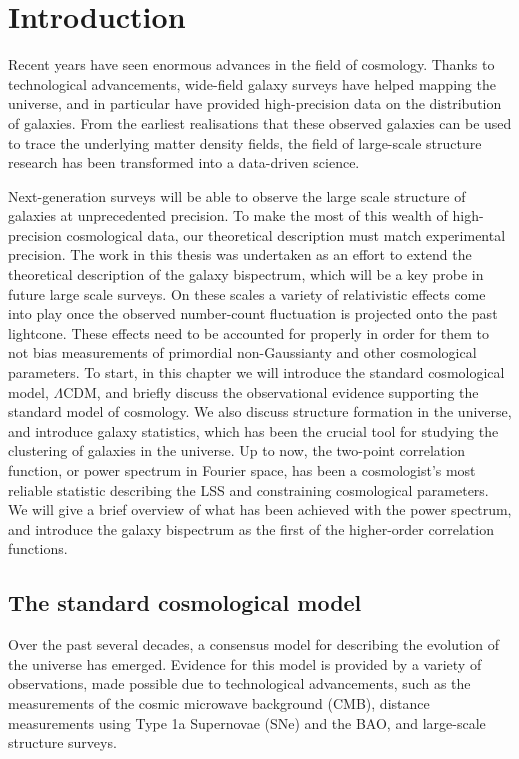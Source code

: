 
\chapter{Introduction}
\label{chapter:introgen}

Recent years have seen enormous advances in the field of cosmology. Thanks to technological advancements, wide-field galaxy surveys have helped mapping the universe, and in particular have provided high-precision data on the distribution of galaxies. From the earliest realisations that these observed galaxies can be used to trace the underlying matter density fields, the field of large-scale structure research has been transformed into a data-driven science. 

Next-generation surveys will be able to observe the large scale structure of galaxies at unprecedented precision. To make the most of this wealth of high-precision cosmological data, our theoretical description must match experimental precision. The work in this thesis was undertaken as an effort to extend the theoretical description of the galaxy bispectrum, which will be a key probe in future large scale surveys. On these scales a variety of relativistic effects come into play once the observed number-count fluctuation is projected onto the past lightcone. These effects need to be accounted for properly in order for them to not bias measurements of primordial non-Gaussianty and other cosmological parameters.
To start, in this chapter we will introduce the standard cosmological model, $\Lambda$CDM, and briefly discuss the observational evidence supporting the standard model of cosmology. We also discuss structure formation in the universe, and introduce galaxy statistics, which has been the crucial tool for studying the clustering of galaxies in the universe. Up to now, the two-point correlation function, or power spectrum in Fourier space, has been a cosmologist's most reliable statistic describing the LSS and constraining cosmological parameters. We will give a brief overview of what has been achieved with the power spectrum, and introduce the galaxy bispectrum as the first of the higher-order correlation functions. 

\section{The standard cosmological model}

Over the past several decades, a consensus model for describing the evolution of the universe has emerged.  Evidence for this model is provided by a variety of observations, made possible due to technological advancements, such as the measurements of the cosmic microwave background (CMB), distance measurements using Type 1a Supernovae (SNe) and the BAO, and large-scale structure surveys. 

